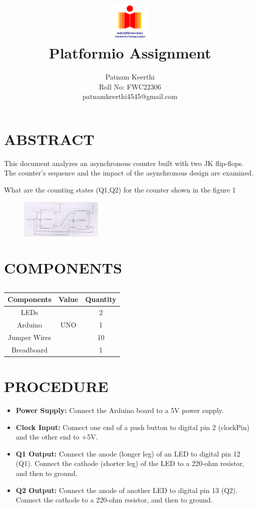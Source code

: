 \documentclass[conference]{IEEEtran}
\title{
\vspace{1cm}
{\includegraphics[width=0.15\textwidth]{iithlogo.jpg} \\ Platformio Assignment} }
\author{Patnam Keerthi \\ Roll No: FWC22306 \\ patnamkeerthi4545@gmail.com}
\begin{document}
\maketitle

 \section {ABSTRACT}
This document analyzes an asynchronous counter built with two JK flip-flops. The counter's sequence and the impact of the asynchronous design are examined.

What are the counting states (Q1,Q2) for the counter shown in the figure 1

 \begin {figure}[h]
 \centering
 \includegraphics[width=0.35\textwidth]{seq.jpg}
 \caption{\label{fig: Sequential Circuit}}
 \end {figure}

 \section{COMPONENTS}
 \begin{table} [htbp]
\centering
\begin{tabular}{| c | c | c |} \hline
Components & Value & Quantity \\\hline
LEDs &  & 2 \\ \hline
Arduino & UNO & 1 \\ \hline
Jumper Wires &  & 10 \\ \hline
Breadboard & & 1 \\ 
\hline
\end{tabular}
\vspace{0.1cm}
\caption{\label{tab:widgets}}
\end{table}

\section{PROCEDURE}
\begin{itemize}
    \item \textbf{Power Supply:} Connect the Arduino board to a 5V power supply.
    \item \textbf{Clock Input:} Connect one end of a push button to digital pin 2 (clockPin) and the other end to +5V.
    \item \textbf{Q1 Output:} Connect the anode (longer leg) of an LED to digital pin 12 (Q1). Connect the cathode (shorter leg) of the LED to a 220-ohm resistor, and then to ground.
    \item \textbf{Q2 Output:} Connect the anode of another LED to digital pin 13 (Q2). Connect the cathode to a 220-ohm resistor, and then to ground.
\end{itemize}
\end{document}
